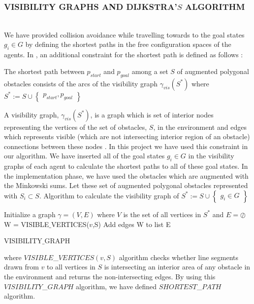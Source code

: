 \documentclass[letterpaper, 10 pt, conference]{ieeeconf}  %
\begin{document}
\subsubsection{VISIBILITY GRAPHS AND DIJKSTRA'$S$ ALGORITHM}\hspace{0pt} \\
We have provided collision avoidance while travelling towards to the goal states $g_i \in G$ by defining the shortest paths in the free configuration spaces of the agents. In \cite{92}, an additional constraint for the shortest path is defined as follows : 

\begin{displayquote}
The shortest path between $p_{start}$ and $p_{goal}$ among a set $S$ of augmented polygonal obstacles consists of the arcs of the visibility graph $\gamma_{vis}(S^*)$ where $S^* := S \cup \begin{Bmatrix}
p_{start}, p_{goal}
\end{Bmatrix}$
\end{displayquote}

A visibility graph, $\gamma_{vis}(S^*)$, is a graph which is set of interior nodes representing the vertices of the set of obstacles, $S$, in the environment and edges which represents visible (which are not intersecting interior region of an obstacle) connections between these nodes \cite{92}. In this project we have used this constraint in our algorithm. We have inserted all of the goal states $g_i \in G$ in the visibility graphs of each agent to calculate the shortest paths to all of these goal states. In the implementation phase, we have used the obstacles which are augmented with the Minkowski sums. Let these set of augmented polygonal obstacles represented with $S_i \subset S$. Algorithm to calculate the visibility graph of  $S^* := S \cup \begin{Bmatrix}
g_i \in G
\end{Bmatrix}$
	
\begin{algorithm}
Initialize a graph $\gamma = (V,E)$ where $V$ is the set of all vertices in $S^*$ and $E = \oslash$  \\
{		
W = VISIBLE$\_$VERTICES($v$,S)\;
Add edges W to list E\;
}\

\caption{VISIBILITY$\_$GRAPH}
\end{algorithm}

where $VISIBLE$\_$VERTICES(v,S)$ algorithm checks whether line segments drawn from $v$ to all vertices in $S$ is intersecting an interior area of any obstacle in the environment and returns the non-intersecting edges.  By using this $VISIBILITY$\_$GRAPH$ algorithm, we have defined $SHORTEST$\_$PATH$ algorithm.
	
\end{document}
